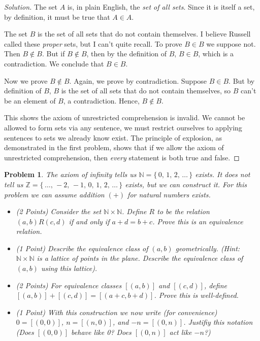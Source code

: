 \documentclass{article}
\theoremstyle{normal}
\newtheorem{problem}{Problem}
\begin{document}
    \begin{proof}[Solution]
        The set $A$ is, in plain English, the \textit{set of all sets}. Since it
        is itself a set, by definition, it must be true that $A\in{A}$.
        \par\hfill\par
        The set $B$ is the set of all sets that do not contain themselves.
        I believe Russell called these \textit{proper} sets, but I can't quite
        recall. To prove $B\in{B}$ we suppose not. Then $B\notin{B}$. But if
        $B\notin{B}$, then by the definition of $B$, $B\in{B}$, which is a
        contradiction. We conclude that $B\in{B}$.
        \par\hfill\par
        Now we prove $B\notin{B}$. Again, we prove by contradiction. Suppose
        $B\in{B}$. But by definition of $B$, $B$ is the set of all sets that
        do not contain themselves, so $B$ can't be an element of $B$, a
        contradiction. Hence, $B\notin{B}$.
        \par\hfill\par
        This shows the axiom of unrestricted comprehension is invalid. We cannot
        be allowed to form sets via any sentence, we must restrict ourselves
        to applying sentences to sets we already know exist. The principle of
        explosion, as demonstrated in the first problem, shows that if we
        allow the axiom of unrestricted comprehension, then \textit{every}
        statement is both true and false.
    \end{proof}
    \clearpage
    \color{blue}
    \begin{problem}
        The axiom of infinity tells us $\mathbb{N}=\{\,0,\,1,\,2,\,\dots\,\}$
        exists. It does not tell us
        $\mathbb{Z}=\{\,\dots,\,-2,\,-1,\,0,\,1,\,2,\,\dots\,\}$ exists, but we
        can construct it. For this problem we can assume addition $(+)$ for
        natural numbers exists.
        \begin{itemize}
            \item (2 Points) Consider the set $\mathbb{N}\times\mathbb{N}$.
                Define $R$ to be the relation $(a,b)R(c,d)$ if and only if
                $a+d=b+c$. Prove this is an equivalence relation.
            \item (1 Point) Describe the equivalence class of $(a,b)$
                geometrically. (Hint: $\mathbb{N}\times\mathbb{N}$ is a lattice
                of points in the plane. Describe the equivalence class of
                $(a,b)$ using this lattice).
            \item (2 Points) For equivalence classes $[(a,b)]$ and $[(c,d)]$,
                define $[(a,b)]+[(c,d)]=[(a+c,b+d)]$. Prove this is
                well-defined.
            \item (1 Point) With this construction we now write
                (for convenience) $0=[(0,0)]$, $n=[(n,0)]$, and $-n=[(0,n)]$.
                Justifiy this notation (Does $[(0,0)]$ behave like 0? Does
                $[(0,n)]$ act like $-n$?)
        \end{itemize}
    \end{problem}
\end{document}
